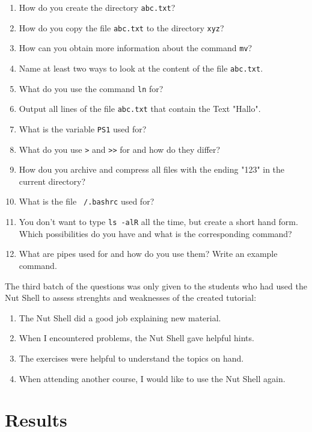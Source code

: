 \documentclass[paper=a4,twoside,abstract=on,cleardoublepage=empty,numbers=noenddot,toc=bib,12pt,appendixprefix=true]{scrreprt}
\begin{document}
\begin{enumerate}
    \item How do you create the directory \texttt{abc.txt}?
    \item How do you copy the file \texttt{abc.txt} to the directory \texttt{xyz}?
    \item How can you obtain more information about the command \texttt{mv}?
    \item Name at least two ways to look at the content of the file \texttt{abc.txt}.
    \item What do you use the command \texttt{ln} for?
    \item Output all lines of the file \texttt{abc.txt} that contain the Text "Hallo".
    \item What is the variable \texttt{PS1} used for?
    \item What do you use \texttt{>} and \texttt{>>} for and how do they differ?
    \item How dou you archive and compress all files with the ending "123" in the current directory?
    \item What is the file \texttt{~/.bashrc} used for?
    \item You don't want to type \texttt{ls -alR} all the time, but create a short hand form. Which possibilities do you have and what is the corresponding command?
    \item What are pipes used for and how do you use them? Write an example command.
\end{enumerate}

The third batch of the questions was only given to the students who had used the Nut Shell to assess strenghts and weaknesses of the created tutorial:

\begin{enumerate}
    \item The Nut Shell did a good job explaining new material.
    \item When I encountered problems, the Nut Shell gave helpful hints.
    \item The exercises were helpful to understand the topics on hand.
    \item When attending another course, I would like to use the Nut Shell again.
\end{enumerate}

\section{Results}
\end{document}
